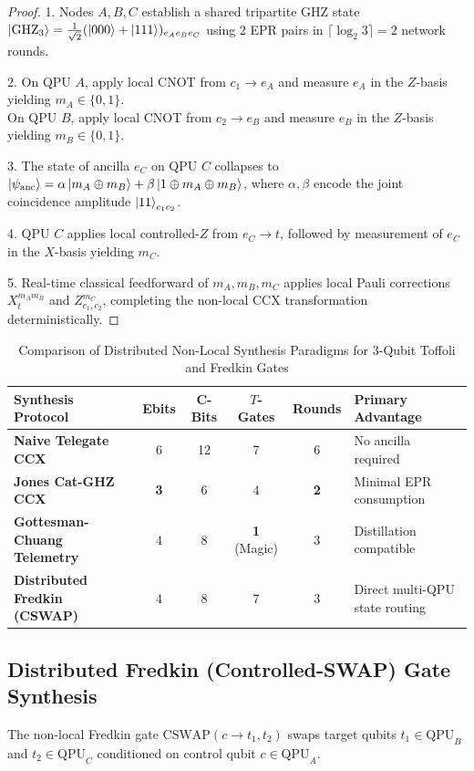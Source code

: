 \begin{proof}
1. Nodes $A, B, C$ establish a shared tripartite GHZ state $\ket{\text{GHZ}_3} = \frac{1}{\sqrt{2}}(\ket{000} + \ket{111})_{e_A e_B e_C}$ using 2 EPR pairs in $\lceil \log_2 3 \rceil = 2$ network rounds.

2. On QPU $A$, apply local CNOT from $c_1 \to e_A$ and measure $e_A$ in the $Z$-basis yielding $m_A \in \{0, 1\}$.\\
On QPU $B$, apply local CNOT from $c_2 \to e_B$ and measure $e_B$ in the $Z$-basis yielding $m_B \in \{0, 1\}$.

3. The state of ancilla $e_C$ on QPU $C$ collapses to $\ket{\psi_{\text{anc}}} = \alpha \ket{m_A \oplus m_B} + \beta \ket{1 \oplus m_A \oplus m_B}$, where $\alpha, \beta$ encode the joint coincidence amplitude $\ket{11}_{c_1 c_2}$.

4. QPU $C$ applies local controlled-$Z$ from $e_C \to t$, followed by measurement of $e_C$ in the $X$-basis yielding $m_C$.

5. Real-time classical feedforward of $m_A, m_B, m_C$ applies local Pauli corrections $X_t^{m_A m_B}$ and $Z_{c_1, c_2}^{m_C}$, completing the non-local CCX transformation deterministically.
\end{proof}

\begin{table}[htbp]
\centering
\small
\caption{Comparison of Distributed Non-Local Synthesis Paradigms for 3-Qubit Toffoli and Fredkin Gates}
\label{tab:distributed_toffoli_comparison}
\begin{tabularx}{\textwidth}{p{4.2cm} c c c c X}
\toprule
\textbf{Synthesis Protocol} & \textbf{Ebits} & \textbf{C-Bits} & \textbf{$T$-Gates} & \textbf{Rounds} & \textbf{Primary Advantage} \\
\midrule
\textbf{Naive Telegate CCX} & 6 & 12 & 7 & 6 & No ancilla required \\
\textbf{Jones Cat-GHZ CCX} & \textbf{3} & 6 & 4 & \textbf{2} & Minimal EPR consumption \\
\textbf{Gottesman-Chuang Telemetry} & 4 & 8 & \textbf{1} (Magic) & 3 & Distillation compatible \\
\textbf{Distributed Fredkin (CSWAP)} & 4 & 8 & 7 & 3 & Direct multi-QPU state routing \\
\bottomrule
\end{tabularx}
\end{table}

\subsection{Distributed Fredkin (Controlled-SWAP) Gate Synthesis}
The non-local Fredkin gate $\text{CSWAP}(c \to t_1, t_2)$ swaps target qubits $t_1 \in \text{QPU}_B$ and $t_2 \in \text{QPU}_C$ conditioned on control qubit $c \in \text{QPU}_A$.

